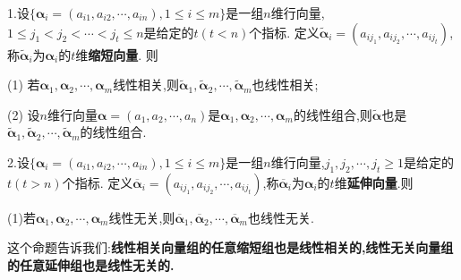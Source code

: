\documentclass[../../main.tex]{subfiles}
\begin{document}
\begin{proposition}[缩短向量与延伸向量]\label{proposition:线性相关向量组的缩短组也线性相关}
1.设\(\{\boldsymbol{\alpha}_i=(a_{i1},a_{i2},\cdots,a_{in}),1\leqslant  i\leqslant  m\}\)是一组\(n\)维行向量,\(1\leqslant  j_1<j_2<\cdots<j_t\leqslant  n\)是给定的\(t(t < n)\)个指标. 定义\(\widetilde{\boldsymbol{\alpha}}_i=(a_{ij_1},a_{ij_2},\cdots,a_{ij_t})\),称\(\widetilde{\boldsymbol{\alpha}}_i\)为\(\boldsymbol{\alpha}_i\)的\(t\)维\textbf{缩短向量}. 则

(1) 若\(\boldsymbol{\alpha}_1,\boldsymbol{\alpha}_2,\cdots,\boldsymbol{\alpha}_m\)线性相关,则\(\widetilde{\boldsymbol{\alpha}}_1,\widetilde{\boldsymbol{\alpha}}_2,\cdots,\widetilde{\boldsymbol{\alpha}}_m\)也线性相关;

(2) 设\(n\)维行向量\(\boldsymbol{\alpha}=(a_1,a_2,\cdots,a_n)\)是\(\boldsymbol{\alpha}_1,\boldsymbol{\alpha}_2,\cdots,\boldsymbol{\alpha}_m\)的线性组合,则\(\widetilde{\boldsymbol{\alpha}}\)也是\(\widetilde{\boldsymbol{\alpha}}_1,\widetilde{\boldsymbol{\alpha}}_2,\cdots,\widetilde{\boldsymbol{\alpha}}_m\)的线性组合.

2.设\(\{\boldsymbol{\alpha}_i=(a_{i1},a_{i2},\cdots,a_{in}),1\leqslant  i\leqslant  m\}\)是一组\(n\)维行向量,\(j_1,j_2,\cdots,j_t\geqslant  1\)是给定的\(t(t > n)\)个指标. 定义\(\overline{\boldsymbol{\alpha}}_i=(a_{ij_1},a_{ij_2},\cdots,a_{ij_t})\),称\(\overline{\boldsymbol{\alpha}}_i\)为\(\boldsymbol{\alpha}_i\)的\(t\)维\textbf{延伸向量}.则

(1)若\(\boldsymbol{\alpha}_1,\boldsymbol{\alpha}_2,\cdots,\boldsymbol{\alpha}_m\)线性无关,则\(\overline{\boldsymbol{\alpha}}_1,\overline{\boldsymbol{\alpha}}_2,\cdots,\overline{\boldsymbol{\alpha}}_m\)也线性无关.
\end{proposition}
\begin{note}
这个命题告诉我们:\textbf{线性相关向量组的任意缩短组也是线性相关的,线性无关向量组的任意延伸组也是线性无关的.}
\end{note}
\end{document}
